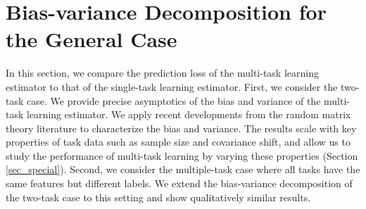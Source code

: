 \section{Bias-variance Decomposition for the General Case}\label{sec_general}

In this section, we compare the prediction loss of the multi-task learning estimator to that of the single-task learning estimator.
First, we consider the two-task case.
We provide precise asymptotics of the bias and variance of the multi-task learning estimator.
We apply recent developments from the random matrix theory literature to characterize the bias and variance.
The results scale with key properties of task data such as sample size and covariance shift, and allow us to study the performance of multi-task learning by varying these properties (Section \ref{sec_special}).
Second, we consider the multiple-task case where all tasks have the same features but different labels.
We extend the bias-variance decomposition of the two-task case to this setting and show qualitatively similar results.



\iffalse
First, we give the basic assumption for our main objects---the random matrices $X_i$, $i=1,2$.

\begin{assumption}[Moment assumptions]%
We will consider $n\times p$ random matrices of the form $X=Z\Sigma^{1/2}$, where $\Sigma$  is a $p\times p$ deterministic positive definite symmetric matrix, and $Z=(z_{ij})$ is an $n\times p$ random matrix with real i.i.d. entries with mean zero and variance one. Note that the rows of $X$ are i.i.d. centered random vectors with covariance matrix $\Sigma$. For simplicity, we assume that all the moments of $z_{ij}$ exists, that is, for any fixed $k\in \N$, there exists a constant $C_k>0$ such that
\begin{equation}\label{assmAhigh}
\mathbb{E} |z_{ij}|^k \le C_k ,\quad 1\le i \le n, \ \ 1\le j \le p.
\end{equation}
 We assume that $n=\rho p$ for some fixed constant $\rho>1$. Without loss of generality, after a rescaling we can assume that the norm of $\Sigma$ is bounded by a constant $C>0$. Moreover, we assume that $\Sigma$ is well-conditioned: $\kappa(\Sigma)\le C$, where $\kappa(\cdot)$ denotes the condition number.
\end{assumption}
Here we have assumed \eqref{assmAhigh} solely for simplicity of representation. If the entries of $Z$ only have finite $a$-th moment for some $a>4$, then all the results below still hold except that we need to replace $\OO(p^{-\frac12+\e})$ with $\OO( p^{-\frac12+\frac2a +\epsilon})$ in some error bounds.
We will not get deeper into this issue in this section, but refer the reader to Corollary \ref{main_cor} in Section \ref{sec locallaw1}.
\fi


